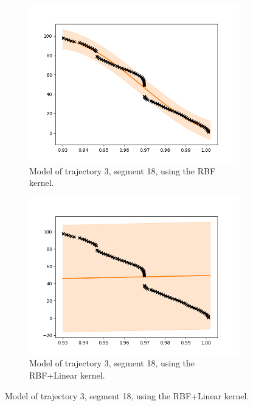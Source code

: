 \begin{figure}
    \centering
    \begin{subfigure}[b]{0.475\textwidth}
        \centering
        \includegraphics[width=\textwidth]{figures/forecasting/gp_3_18_rbf}
        \caption[]%
        {{\small Model of trajectory 3, segment 18, using the RBF kernel.}}    
        \label{fig:3-18-rbf}
    \end{subfigure}
    \hfill
    \begin{subfigure}[b]{0.475\textwidth}  
        \centering 
        \includegraphics[width=\textwidth]{figures/forecasting/gp_3_18_rbf_linear}
            \caption[]%
            {{\small Model of trajectory 3, segment 18, using the RBF+Linear kernel.}}    

\end{subfigure}
\end{figure}
